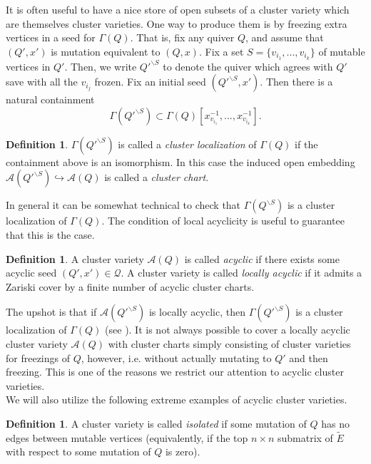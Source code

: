 \documentclass[11pt]{amsart}
\theoremstyle{definition}
\newtheorem{defn}[thm]{Definition}
\theoremstyle{remark}
\numberwithin{equation}{section}
\begin{document}
It is often useful to have a nice store of open subsets of a cluster variety which are themselves cluster varieties. One way to produce them is by freezing extra vertices in a seed for $\Gamma(Q)$. That is, fix any quiver $Q$, and assume that $(Q', x')$ is mutation equivalent to $(Q, x)$. Fix a set $S=\{v_{i_1}, ..., v_{i_k}\}$ of mutable vertices in $Q'$. Then, we write $Q'^{\backslash S}$ to denote the quiver which agrees with $Q'$ save with all the $v_{i_j}$ frozen. Fix an initial seed $(Q'^{\backslash S}, x')$. Then there is a natural containment $$\Gamma(Q'^{\backslash S}) \subset \Gamma(Q)[x_{v_{i_1}}^{-1}, ..., x_{v_{i_k}}^{-1}].$$ 

\begin{defn}
    $\Gamma(Q'^{\backslash S})$ is called a \textit{cluster localization} of $\Gamma(Q)$ if the containment above is an isomorphism. In this case the induced open embedding $\mathcal{A}(Q'^{\backslash S}) \hookrightarrow \mathcal{A}(Q)$ is called a \textit{cluster chart}.
\end{defn}

In general it can be somewhat technical to check that $\Gamma(Q^{\backslash S})$ is a cluster localization of $\Gamma(Q)$. The condition of local acyclicity is useful to guarantee that this is the case.

\begin{defn}
    A cluster variety $\mathcal{A}(Q)$ is called \textit{acyclic} if there exists some acyclic seed $(Q', x') \in \mathcal{Q}$. A cluster variety is called \textit{locally acyclic} if it admits a Zariski cover by a finite number of acyclic cluster charts. 
\end{defn}

The upshot is that if $\mathcal{A}(Q'^{\backslash S})$ is locally acyclic, then $\Gamma(Q'^{\backslash S})$ is a cluster localization of $\Gamma(Q)$ (see \cite{Mul}). It is not always possible to cover a locally acyclic cluster variety $\mathcal{A}(Q)$ with cluster charts simply consisting of cluster varieties for freezings of $Q$, however, i.e. without actually mutating to $Q'$ and then freezing. This is one of the reasons we restrict our attention to acyclic cluster varieties.\\

We will also utilize the following extreme examples of acyclic cluster varieties.

\begin{defn}
    A cluster variety is called \textit{isolated} if some mutation of $Q$ has no edges between mutable vertices (equivalently, if the top $n \times n$ submatrix of $\tilde{E}$ with respect to some mutation of $Q$ is zero).
\end{defn}
\end{document}
